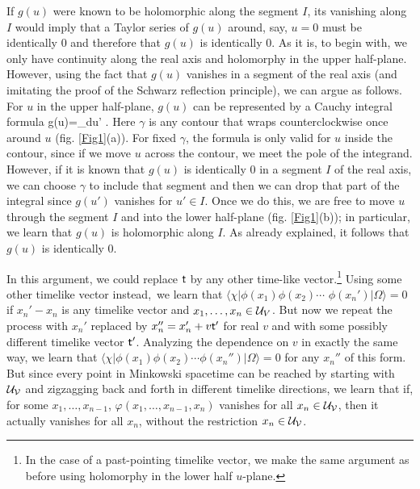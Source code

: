 \documentclass[12pt]{article}
\numberwithin{equation}{section}
\def\d{\mathrm d}
\begin{document}
If $g(u)$ were known to be holomorphic along the segment $I$, its vanishing along $I$ would imply that a Taylor series of $g(u)$
around, say, $u=0$ must be identically 0 and therefore that $g(u)$ is identically 0.  As it is, to begin with, we only have continuity
along the real axis and holomorphy in the upper half-plane.  However, using the fact that $g(u)$ vanishes in a segment of the
real axis (and imitating the proof of the Schwarz reflection principle), we can argue as follows.   For
$u$ in the upper half-plane, $g(u)$ can be represented by a Cauchy integral formula 
\be\label{tefo} g(u)=\oint_\gamma \d u' . \ee
Here $\gamma$ is any contour that wraps counterclockwise once around $u$ (fig. \ref{Fig1}(a)).  For fixed $\gamma$, the formula is only valid for $u$ inside
the contour, since if we move $u$ across the contour, we meet the pole of the integrand.  However, if it is known
that $g(u)$ is identically 0 in a segment $I$ of the real axis, we can choose $\gamma$ to include that segment 
and then we can drop that part of the integral since $g(u')$ vanishes for $u'\in I$.  Once we do this, we are free to
move $u$ through the segment $I$ and into the lower half-plane (fig. \ref{Fig1}(b)); in particular, we learn that $g(u)$ is holomorphic along $I$.
As already explained, it follows that $g(u)$ is identically 0.  

In this argument, we could replace ${\sf t}$ by any other time-like vector.\footnote{In the case of a past-pointing timelike
vector, we make the same argument as before using holomorphy in the lower half $u$-plane.} Using some other 
timelike vector instead,\ we learn that 
$\langle\chi|\phi(x_1)\phi(x_2)\cdots$ $\phi(x_n')|\Omega\rangle=0$ if $x_n'-x_n$ is any timelike vector and $x_1,\dots, x_n\in{\mathcal U}_V$.
But now we repeat the process with $x_n'$ replaced by $x_n''=x_n'+v {\sf t}'$ for  real $v$ and with some possibly different timelike vector ${\sf t}'$.
Analyzing the dependence on $v$ in exactly the same way, we learn that $\langle\chi|\phi(x_1)\phi(x_2)\cdots \phi(x_n'')|\Omega\rangle=0$
for any $x_n''$ of this form.  But since every point in Minkowski spacetime can be reached by starting with ${\mathcal U}_{\mathcal V}$ and zigzagging back
and forth in different timelike directions,  we learn that if, for some $x_1,\dots,x_{n-1}$,
$\varphi(x_1,\dots,x_{n-1},x_n)$
vanishes for all $x_n\in {\mathcal U}_{\mathcal V}$, then it actually vanishes for all $x_n$, without the restriction $x_n\in {\mathcal U}_{\mathcal V}$.
\end{document}

